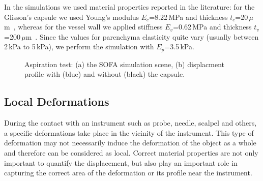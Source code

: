\documentclass{llncs}
\begin{document}
In the simulations we used material properties reported in the literature: for the 
Glisson's capsule we used Young's modulus $E_c$=8.22\,MPa and thickness $t_c$=20\,$\mu$m~\cite{Umale2011},
whereas for the vessel wall we applied stiffness $E_v$=0.62\,MPa and thickness $t_v$=200\,$\mu$m~\cite{Peterlik2012}.
Since the values for parenchyma elasticity quite vary (usually between 2\,kPa to 5\,kPa), we perform the simulation 
with $E_p$=3.5\,kPa.

\begin{figure}[t]
  \caption{\label{fig-aspiration}Aspiration test: (a) the SOFA simulation scene, (b) displacment profile
  with (blue) and without (black) the capsule.}
\end{figure}

\subsection{Local Deformations} %
During the contact with an instrument such as probe, needle, scalpel and others,
a specific deformations take place in the vicinity of
the instrument. This type of deformation may not necessarily induce the
deformation of the object as a whole and therefore can be considered as
local. Correct material properties are not only important to quantify the
displacement, but also play an important role in capturing the correct area of
the deformation or its profile near the instrument.
\end{document}
